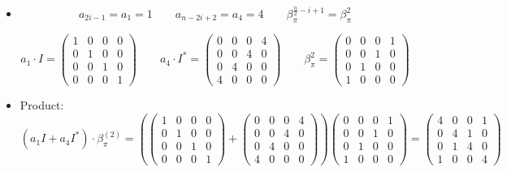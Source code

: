 \documentclass{article}
\begin{document}
\begin{itemize}
    \item
    \[
        a_{2i - 1} = a_1 = 1 \qquad
        a_{n - 2i + 2} = a_4 = 4 \qquad
        \beta_\pi^{\frac{n}{2} - i + 1} = \beta_\pi^{2}
    \]

    \[
        a_1 \cdot I =
        \begin{pmatrix}
        1 & 0 & 0 & 0\\
        0 & 1 & 0 & 0\\
        0 & 0 & 1 & 0\\
        0 & 0 & 0 & 1
        \end{pmatrix}
        \qquad
        a_4 \cdot I^* =
        \begin{pmatrix}
        0 & 0 & 0 & 4\\
        0 & 0 & 4 & 0\\
        0 & 4 & 0 & 0\\
        4 & 0 & 0 & 0
        \end{pmatrix}
        \qquad
        \beta_\pi^{2} =
        \begin{pmatrix}
        0 & 0 & 0 & 1\\
        0 & 0 & 1 & 0\\
        0 & 1 & 0 & 0\\
        1 & 0 & 0 & 0
        \end{pmatrix}
    \]

    \item
    Product:
    \[
    (a_1 I + a_4 I^*) \cdot \beta_\pi^{(2)} =
    \left(
    \begin{pmatrix}
    1 & 0 & 0 & 0\\
    0 & 1 & 0 & 0\\
    0 & 0 & 1 & 0\\
    0 & 0 & 0 & 1
    \end{pmatrix}
    +
    \begin{pmatrix}
    0 & 0 & 0 & 4\\
    0 & 0 & 4 & 0\\
    0 & 4 & 0 & 0\\
    4 & 0 & 0 & 0
    \end{pmatrix}
    \right)
    \begin{pmatrix}
    0 & 0 & 0 & 1\\
    0 & 0 & 1 & 0\\
    0 & 1 & 0 & 0\\
    1 & 0 & 0 & 0
    \end{pmatrix}
    =
    \begin{pmatrix}
    4 & 0 & 0 & 1\\
    0 & 4 & 1 & 0\\
    0 & 1 & 4 & 0\\
    1 & 0 & 0 & 4
    \end{pmatrix}
    \]
\end{itemize}
\end{document}
